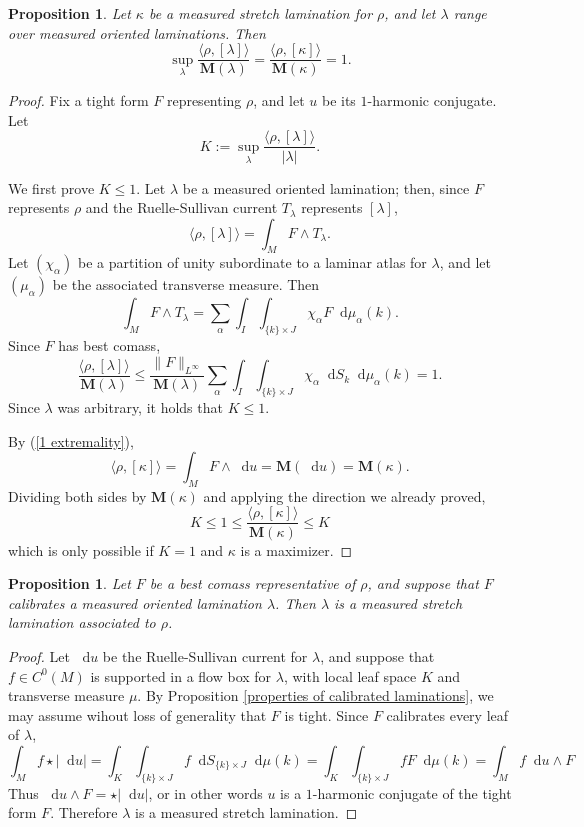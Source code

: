 \documentclass[reqno,11pt]{amsart}
\newcommand*\dif{\mathop{}\!\mathrm{d}}
\newcommand{\Mass}{\mathbf M}
\newtheorem{proposition}[theorem]{Proposition}
\theoremstyle{definition}
\numberwithin{equation}{section}
\begin{document}
\begin{proposition}\label{L equals K}
	Let $\kappa$ be a measured stretch lamination for $\rho$, and let $\lambda$ range over measured oriented laminations. Then 
	\begin{equation}\label{L equals K formula}
	\sup_\lambda \frac{\langle \rho, [\lambda]\rangle}{\Mass(\lambda)} = \frac{\langle \rho, [\kappa]\rangle}{\Mass(\kappa)} = 1.
	\end{equation}
\end{proposition}
\begin{proof}
Fix a tight form $F$ representing $\rho$, and let $u$ be its $1$-harmonic conjugate.
Let
$$K :=  \sup_\lambda \frac{\langle \rho, [\lambda]\rangle}{|\lambda|}.$$

We first prove $K \leq 1$.
Let $\lambda$ be a measured oriented lamination; then, since $F$ represents $\rho$ and the Ruelle-Sullivan current $T_\lambda$ represents $[\lambda]$,
$$\langle \rho, [\lambda]\rangle = \int_M F \wedge T_\lambda.$$
Let $(\chi_\alpha)$ be a partition of unity subordinate to a laminar atlas for $\lambda$, and let $(\mu_\alpha)$ be the associated transverse measure. Then 
$$\int_M F \wedge T_\lambda = \sum_\alpha \int_I \int_{\{k\} \times J} \chi_\alpha F \dif \mu_\alpha(k).$$
Since $F$ has best comass,
$$\frac{\langle \rho, [\lambda] \rangle}{\Mass(\lambda)}
\leq \frac{\|F\|_{L^\infty}}{\Mass(\lambda)} \sum_\alpha \int_I \int_{\{k\} \times J} \chi_\alpha \dif S_k \dif \mu_\alpha(k) = 1.$$
Since $\lambda$ was arbitrary, it holds that $K \leq 1$.

By (\ref{1 extremality}),
$$\langle \rho, [\kappa]\rangle = \int_M F \wedge \dif u = \Mass(\dif u) = \Mass(\kappa).$$
Dividing both sides by $\Mass(\kappa)$ and applying the direction we already proved,
$$K \leq 1 \leq \frac{\langle \rho, [\kappa]\rangle}{\Mass(\kappa)} \leq K$$
which is only possible if $K = 1$ and $\kappa$ is a maximizer.
\end{proof}

\begin{proposition}\label{calibrated means measured stretch}
Let $F$ be a best comass representative of $\rho$, and suppose that $F$ calibrates a measured oriented lamination $\lambda$.
Then $\lambda$ is a measured stretch lamination associated to $\rho$.
\end{proposition}
\begin{proof}
Let $\dif u$ be the Ruelle-Sullivan current for $\lambda$, and suppose that $f \in C^0(M)$ is supported in a flow box for $\lambda$, with local leaf space $K$ and transverse measure $\mu$.
By Proposition \ref{properties of calibrated laminations}, we may assume wihout loss of generality that $F$ is tight.
Since $F$ calibrates every leaf of $\lambda$,
$$\int_M f \star |\dif u| = \int_K \int_{\{k\} \times J} f \dif S_{\{k\} \times J} \dif \mu(k) = \int_K \int_{\{k\} \times J} fF \dif \mu(k) = \int_M f\dif u \wedge F$$
Thus $\dif u \wedge F = \star |\dif u|$, or in other words $u$ is a $1$-harmonic conjugate of the tight form $F$.
Therefore $\lambda$ is a measured stretch lamination.
\end{proof}
\end{document}
